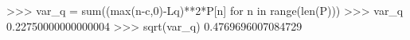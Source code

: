 
>>> var_q = sum((max(n-c,0)-Lq)**2*P[n] for n in range(len(P)))
>>> var_q
0.22750000000000004
>>> sqrt(var_q)
0.4769696007084729


